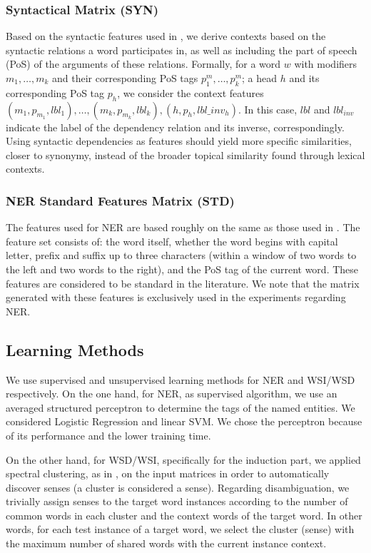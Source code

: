\documentclass{llncs}
\begin{document}
\subsubsection{Syntactical Matrix (SYN)}
Based on the syntactic features used in   \cite{LevyG14,Panchenko2017}, we derive contexts based on the syntactic relations a word participates in, as well as including the part of speech (PoS) of the arguments of these relations. Formally, for a word $w$ with modifiers $m_1, \dots, m_k$ and their corresponding PoS tags $p^m_1, \dots, p^m_k$; a head $h$ and its corresponding PoS tag $p_h$, we consider the context features $(m_1, p_{m_1}, lbl_1), \dots, \allowbreak (m_k, p_{m_k}, lbl_k), \allowbreak (h,p_h,lbl\_inv_h)$. In this case, $lbl$ and $lbl_{inv}$ indicate the label of the dependency relation and its inverse, correspondingly. Using syntactic dependencies as features should yield more specific similarities, closer to synonymy, instead of the broader topical similarity found through lexical contexts.
\subsubsection{NER Standard Features Matrix (STD)}
The features used for NER are based roughly on the same as those used in \cite{Daume2006,Balasuriya2009}. The feature set consists of: the word itself, whether the word begins with capital letter, prefix and suffix up to three characters (within a window of two words to the left and two words to the right), and the PoS tag of the current word. These features are considered to be standard in the literature. We note that the matrix generated with these features is exclusively used in the experiments regarding NER.	

\subsection{Learning Methods}
We use supervised and unsupervised learning methods for NER and WSI/WSD respectively. On the one hand, for NER, as supervised algorithm, we use an averaged structured perceptron \cite{Collins2002,Daume2006} to determine the tags of the named entities. We considered Logistic Regression and linear SVM. We chose the perceptron because of its performance and the lower training time.

On the other hand, for WSD/WSI, specifically for the induction part, we applied spectral clustering, as in  \cite{GoyalH14}, on the input matrices in order to automatically discover senses (a cluster is considered a sense). Regarding disambiguation, we trivially assign senses to the target word instances according to the number of common words in each cluster and the context words of the target word. In other words, for each test instance of a target word, we select the cluster (sense) with the maximum number of shared words with the current instance context.
\end{document}
